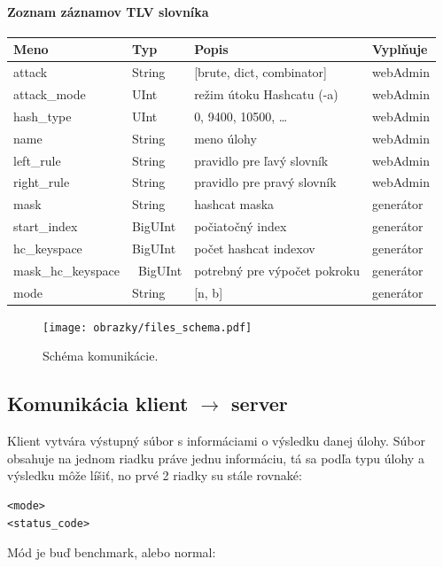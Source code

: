 \paragraph{Zoznam záznamov TLV slovníka}
\begin{center}
	\begin{tabular}{ | l | l | l | l | }
		\hline
		Meno & Typ & Popis & Vyplňuje \\
		\hline
		\hline
		attack & String & [brute, dict, combinator] & webAdmin \\
		\hline
		attack\_mode & UInt & režim útoku Hashcatu (-a) & webAdmin \\
		\hline
		hash\_type & UInt & 0, 9400, 10500, \ldots & webAdmin \\
		\hline
		name & String & meno úlohy & webAdmin \\
		\hline
		left\_rule & String & pravidlo pre ľavý slovník & webAdmin \\
		\hline
		right\_rule & String & pravidlo pre pravý slovník & webAdmin \\
		\hline
		mask & String & hashcat maska & generátor \\
		\hline
		start\_index & BigUInt & počiatočný index & generátor \\
		\hline
		hc\_keyspace & BigUInt & počet hashcat indexov & generátor \\
		\hline
		mask\_hc\_keyspace & BigUInt & potrebný pre výpočet pokroku & generátor\\
		\hline
		mode & String & [n, b] & generátor \\
		\hline
	\end{tabular}
\end{center}

\begin{figure}[H]
	\centering
	\texttt{[image: obrazky/files\_schema.pdf]}
	\caption{Schéma komunikácie.}
\end{figure}

\subsection*{Komunikácia klient $\rightarrow$ server}
\label{from_client}
Klient vytvára výstupný súbor s informáciami o výsledku danej úlohy.
Súbor obsahuje na jednom riadku práve jednu informáciu, tá sa podľa typu úlohy a výsledku môže líšiť, no prvé 2 riadky su stále rovnaké: 
\begin{verbatim}
<mode>
<status_code>
\end{verbatim}
Mód je buď benchmark, alebo normal:

